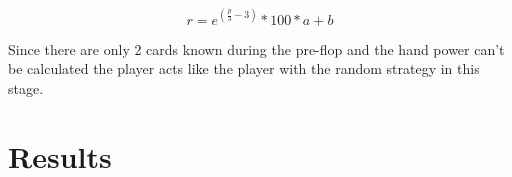 \begin{equation}
	\label{equ:powerranking}
	r = e^{(\frac{p}{3} - 3)} * 100 * a + b
\end{equation}

Since there are only 2 cards known during the pre-flop and the hand power can't be calculated the player acts like the player with the random strategy in this stage.

\section{Results}


















